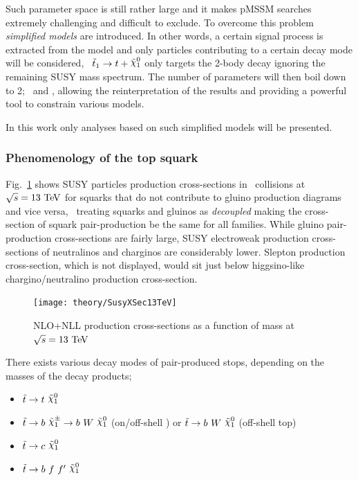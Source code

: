 				\noindent Such parameter space is still rather large and it makes \ac{pMSSM} searches extremely challenging and difficult to exclude. To overcome this problem \textit{simplified models} are introduced. In other words, a certain signal process is extracted from the model and only particles contributing to a certain decay mode will be considered, \eg\ $\stopone \ra t + \ninoone$ only targets the 2-body decay ignoring the remaining \ac{SUSY} mass spectrum. The number of parameters will then boil down to 2; \mstop\ and \mLSP, allowing the reinterpretation of the results and providing a powerful tool to constrain various models. 

				In this work only analyses based on such simplified models will be presented. 

			\subsubsection*{Phenomenology of the top squark}

				Fig.~\ref{fig:susy_13TeV_xsec} shows \ac{SUSY} particles production cross-sections in \pp\ collisions at $\sqrt{s} = 13 \TeV$ for squarks that do not contribute to gluino production diagrams and vice versa, \ie\ treating squarks and gluinos as \textit{decoupled} making the cross-section of squark pair-production be the same for all families. While gluino pair-production cross-sections are fairly large, \ac{SUSY} electroweak production cross-sections of neutralinos and charginos are considerably lower. Slepton production cross-section, which is not displayed, would sit just below higgsino-like chargino/neutralino production cross-section. 

				\begin{figure}[!htb]
					\centering
					\texttt{[image: theory/SusyXSec13TeV]}
					\caption{\label{fig:susy_13TeV_xsec} NLO+NLL production cross-sections as a function of mass at $\sqrt{s} = 13 \TeV$~\cite{Borschensky:2014cia}}
				\end{figure}

				There exists various decay modes of pair-produced stops, depending on the masses of the decay products; 

				\begin{itemize}
					\item $\stop \ra t\ \ninoone$
					\item $\stop \ra b\ \chinoonepm \ra b\  W\  \ninoone$ (on/off-shell \Wboson) or $\stop \ra b\  W\  \ninoone$ (off-shell top)
					\item $\stop \ra c\ \ninoone$
					\item $\stop \ra b\ f\ f'\ \ninoone$
				\end{itemize} 

